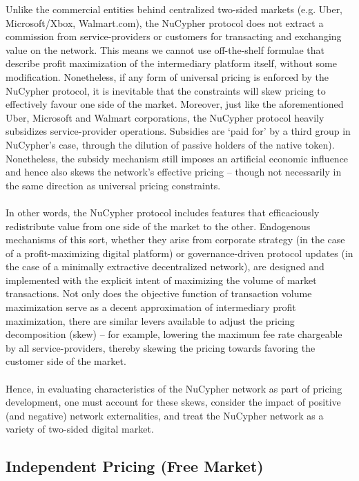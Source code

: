 \documentclass[longbibliography,nofootinbib]{revtex4-1}
\begin{document}
Unlike the commercial entities behind centralized two-sided markets (e.g. Uber, Microsoft/Xbox, Walmart.com), the NuCypher protocol does not extract a commission from service-providers or customers for transacting and exchanging value on the network. This means we cannot use off-the-shelf formulae that describe profit maximization of the intermediary platform itself, without some modification. Nonetheless, if any form of universal pricing is enforced by the NuCypher protocol, it is inevitable that the constraints will skew pricing to effectively favour one side of the market. Moreover, just like the aforementioned Uber, Microsoft and Walmart corporations, the NuCypher protocol heavily subsidizes service-provider operations. Subsidies are ‘paid for’ by a third group in NuCypher’s case, through the dilution of passive holders of the native token). Nonetheless, the subsidy mechanism still imposes an artificial economic influence and hence also skews the network’s effective pricing – though not necessarily in the same direction as universal pricing constraints. 
\\\\
In other words, the NuCypher protocol includes features that efficaciously redistribute value from one side of the market to the other. Endogenous mechanisms of this sort, whether they arise from corporate strategy (in the case of a profit-maximizing digital platform) or governance-driven protocol updates (in the case of a minimally extractive decentralized network), are designed and implemented with the explicit intent of maximizing the volume of market transactions. Not only does the objective function of transaction volume maximization serve as a decent approximation of intermediary profit maximization, there are similar levers available to adjust the pricing decomposition (skew) – for example, lowering the maximum fee rate chargeable by all service-providers, thereby skewing the pricing towards favoring the customer side of the market. 
\\\\
Hence, in evaluating characteristics of the NuCypher network as part of pricing development, one must account for these skews, consider the impact of positive (and negative) network externalities, and treat the NuCypher network as a variety of two-sided digital market. 

\subsection{Independent Pricing (Free Market)}
\end{document}
